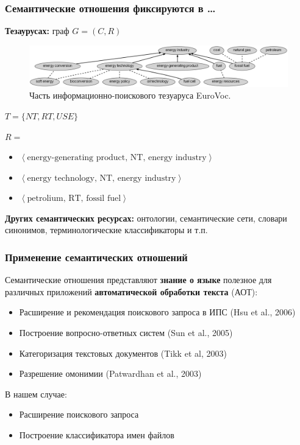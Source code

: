 \documentclass{beamer}
\begin{document}
\begin{frame}
\frametitle{Семантические отношения фиксируются в \ldots}

\textbf{Тезаурусах:} граф $G = (C,R)$

\begin{figure}	
	\centering
		\includegraphics[width=1.0\textwidth]{figures/thesaurus2}
		\caption{Часть информационно-поискового тезуаруса EuroVoc.}
\end{figure}

\textbf{$T = \{NT, RT, USE\}$}

\textbf{$R=$}

\begin{itemize}
	\item $\left\langle   \text{energy-generating product, NT, energy industry} \right\rangle$
	\item $\left\langle   \text{energy technology, NT, energy industry} \right\rangle$
	\item $\left\langle   \text{petrolium, RT, fossil fuel} \right\rangle$
\end{itemize}

\textbf{Других семантических ресурсах:} онтологии, семантические сети, словари синонимов, терминологические классификаторы и т.п.

\end{frame}

\begin{frame}
\frametitle{Применение семантических отношений}
Семантические отношения представляют \textbf{знание о языке} полезное для различных приложений \textbf{автоматической обработки текста} (АОТ):
\begin{itemize}
  \item Расширение и рекомендация поискового запроса в ИПС (Hsu et al., 2006)
  \item Построение вопросно-ответных систем (Sun et al., 2005)	
  \item Категоризация текстовых документов (Tikk et al, 2003)
  \item Разрешение омонимии (Patwardhan et al., 2003)
  
	\end{itemize}
	
	В нашем случае:
	\begin{itemize}
	  \item Расширение поискового запроса
	  \item Построение классификатора имен файлов
	\end{itemize}

\end{frame}
\end{document}
